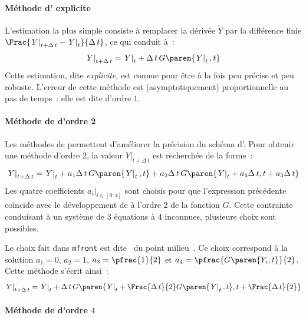 \documentclass[rectoverso,pleiades,pstricks,leqno,anti]{texmf/note_technique_2010}
\newcommand{\mfront}{\texttt{mfront}}
\newcommand{\debutpas}[1]{\ensuremath{\left.#1\right|_{t}}}
\newcommand{\finpas}[1]{\ensuremath{\left.#1\right|_{t+\Delta\, t}}}
\begin{document}
\paragraph{Méthode d' explicite} L'estimation la plus simple
consiste à remplacer la dérivée \(\dot{Y}\) par la différence finie
\(\Frac{\finpas{Y}-\debutpas{Y}}{\Delta\, t}\), ce qui conduit à~:
\begin{equation}
  \label{eq:explicite}
  \finpas{Y}=\debutpas{Y}+\Delta\,t\,G\paren{\debutpas{Y},t}
\end{equation}
Cette estimation, dite {\em explicite}, est connue pour être à la fois
peu précise et peu robuste. L'erreur de cette méthode est
(asymptotiquement) proportionnelle au pas de temps~: elle est dite
d'ordre \(1\).

\paragraph{Méthode de  d'ordre 2}
Les méthodes de  permettent d'améliorer la précision
du schéma d'. Pour obtenir une méthode d'ordre \(2\), la
valeur \(\finpas{Y}\) est recherchée de la forme~:
\[
\finpas{Y} = \debutpas{Y}+a_{1}\Delta\,t\,G\paren{\debutpas{Y},t}+a_{2}\Delta\,t\,G\paren{\debutpas{Y}+a_{4}\Delta\, t,t+a_{3}\Delta\,t}
\]
Les quatre coefficients \(\left.a_{i}\right|_{i \in [0:4]}\) sont
choisis pour que l'expression précédente coïncide avec le
développement de  à l'ordre \(2\) de la fonction \(G\).
Cette contrainte conduisant à un système de \(3\) équations à \(4\)
inconnues, plusieurs choix sont possibles.

Le choix fait dans \mfront{} est dite \og~du point milieu~\fg{}. Ce
choix correspond à la solution \(a_{1}=0\), \(a_{2}=1\),
\(a_{3}=\pfrac{1}{2}\) et \(a_{4}=\pfrac{G\paren{Y_{i},t}}{2}\). Cette
méthode s'écrit ainsi~:
\begin{equation}
  \label{eq:RK2}
  \finpas{Y} = \debutpas{Y}+\Delta\,t\,G\paren{\debutpas{Y}+\Frac{\Delta\,
      t}{2}G\paren{\debutpas{Y},t},t+\Frac{\Delta\, t}{2}}
\end{equation}

\paragraph{Méthode de  d'ordre $4$}
\end{document}
